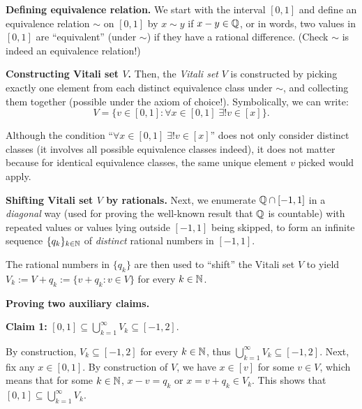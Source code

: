 \begin{enumerate}
\begin{pf}
\textbf{Defining equivalence relation.} We start with the interval \([0,1]\)
and define an equivalence relation \(\sim\) on \([0,1]\) by \(x\sim y\) if
\(x-y\in \mathbb{Q}\), or in words, two values in \([0,1]\) are ``equivalent'' (under
\(\sim\)) if they have a rational difference. (Check \(\sim\) is indeed an
equivalence relation!)

\textbf{Constructing Vitali set \(V\).} Then, the \emph{Vitali set} \(V\) is
constructed by picking exactly one element from each distinct equivalence class
under \(\sim\), and collecting them together (possible under the axiom of
choice!).  Symbolically, we can write:
\[
V=\{v\in[0,1]:\forall x\in [0,1]\; \exists! v\in [x]\}.
\]
\begin{note}
Although the condition ``\(\forall x\in [0,1]\; \exists! v\in [x]\)'' does not
only consider distinct classes (it involves all possible equivalence classes
indeed), it does not matter because for identical equivalence classes, the
same unique element \(v\) picked would apply.
\end{note}
\begin{center}
\end{center}

\textbf{Shifting Vitali set \(V\) by rationals.}
Next, we enumerate \(\mathbb{Q}\cap[-1,1]\) in a \emph{diagonal} way (used for proving
the well-known result that \(\mathbb{Q}\) is countable) with repeated values or values
lying outside \([-1,1]\) being skipped, to form an infinite sequence
\(\{q_k\}_{k\in\mathbb{N}}\) of \emph{distinct} rational numbers in \([-1,1]\).

The rational numbers in \(\{q_k\}\) are then used to ``shift'' the Vitali set
\(V\) to yield \(V_k:=V+q_k:=\{v+q_k:v\in V\}\) for every \(k\in\mathbb{N}\).

\textbf{Proving two auxiliary claims.}

\textbf{Claim 1:} \([0,1]\subseteq \bigcup_{k=1}^{\infty}V_k\subseteq [-1,2]\).

\begin{pf}
By construction, \(V_k\subseteq [-1,2]\) for every \(k\in\mathbb{N}\), thus
\(\bigcup_{k=1}^{\infty}V_k\subseteq [-1,2]\). Next, fix any \(x\in [0,1]\). By
construction of \(V\), we have \(x\in [v]\) for some \(v\in V\), which means
that for some \(k\in\mathbb{N}\), \(x-v=q_k\) or \(x=v+q_k\in V_k\). This shows that
\([0,1]\subseteq \bigcup_{k=1}^{\infty}V_k\).
\end{pf}


\end{pf}
\end{enumerate}
